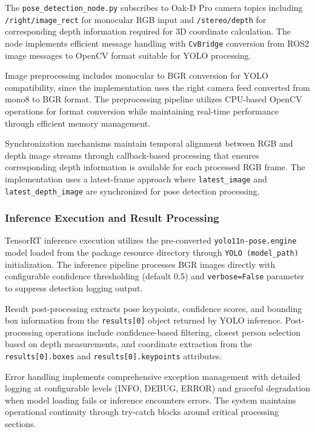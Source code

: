 The \texttt{pose\_detection\_node.py} subscribes to Oak-D Pro camera topics including \texttt{/right/image\_rect} for monocular RGB input and \texttt{/stereo/depth} for corresponding depth information required for 3D coordinate calculation. The node implements efficient message handling with \texttt{CvBridge} conversion from ROS2 image messages to OpenCV format suitable for YOLO processing.

Image preprocessing includes monocular to BGR conversion for YOLO compatibility, since the implementation uses the right camera feed converted from mono8 to BGR format. The preprocessing pipeline utilizes CPU-based OpenCV operations for format conversion while maintaining real-time performance through efficient memory management.

Synchronization mechanisms maintain temporal alignment between RGB and depth image streams through callback-based processing that ensures corresponding depth information is available for each processed RGB frame. The implementation uses a latest-frame approach where \texttt{latest\_image} and \texttt{latest\_depth\_image} are synchronized for pose detection processing.

\subsubsection{Inference Execution and Result Processing}

TensorRT inference execution utilizes the pre-converted \texttt{yolo11n-pose.engine} model loaded from the package resource directory through \texttt{YOLO (model\_path)} initialization. The inference pipeline processes BGR images directly with configurable confidence thresholding (default 0.5) and \texttt{verbose=False} parameter to suppress detection logging output.

Result post-processing extracts pose keypoints, confidence scores, and bounding box information from the \texttt{results[0]} object returned by YOLO inference. Post-processing operations include confidence-based filtering, closest person selection based on depth measurements, and coordinate extraction from the \texttt{results[0].boxes} and \texttt{results[0].keypoints} attributes.

Error handling implements comprehensive exception management with detailed logging at configurable levels (INFO, DEBUG, ERROR) and graceful degradation when model loading fails or inference encounters errors. The system maintains operational continuity through try-catch blocks around critical processing sections.

